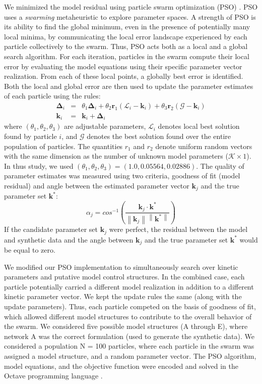 \documentclass[processes,article,accept,moreauthors,pdftex,12pt,a4paper]{mdpi}
\newcommand{\norm}[1]{\left\lVert#1\right\rVert}
\begin{document}
We minimized the model residual using particle swarm optimization (PSO) \citep{PSO}.
PSO uses a \textit{swarming} metaheuristic to explore parameter spaces. 
A strength of PSO is its ability to find the global minimum, even in the presence of potentially many local minima, by communicating the local
error landscape experienced by each particle collectively to the swarm. Thus, PSO acts both as a local and a global search algorithm. 
For each iteration, particles in the swarm compute their local error by evaluating the model equations using their specific parameter vector realization.
From each of these local points, a globally best error is identified. Both the local and global error 
are then used to update the parameter estimates of each particle using the rules:
\begin{eqnarray}
	\mathbf{\Delta}_{i} &=&\theta_{1}\mathbf{\Delta}_{i} + \theta_{2}\mathbf{r}_{1}\left(\mathcal{L}_{i} - \mathbf{k}_{i}\right) + \theta_{3}\mathbf{r}_{2}\left(\mathcal{G} - \mathbf{k}_{i}\right) \\
	\mathbf{k}_{i} &=& \mathbf{k}_{i} + \mathbf{\Delta}_{i}
\end{eqnarray}where $\left(\theta_{1},\theta_{2},\theta_{3}\right)$ are adjustable parameters, $\mathcal{L}_{i}$ denotes local best solution found by particle $i$, and
$\mathcal{G}$ denotes the best solution found over the entire population of particles. The quantities $r_{1}$ and $r_{2}$ denote uniform random vectors with the same dimension as the number of unknown model
parameters ($\mathcal{K}\times{1}$). In thus study, we used $\left(\theta_{1},\theta_{2},\theta_{3}\right) = \left(1.0, 0.05564, 0.02886\right)$. The quality of parameter
estimates was measured using two criteria, goodness of fit (model residual) and angle between the estimated parameter vector $\mathbf{k}_{j}$ and the true parameter set $\mathbf{k}^{*}$:
\begin{equation}
	\alpha_{j} = cos^{-1}\left(\frac{\mathbf{k}_{j}\cdot{\mathbf{k^{*}}}}{\norm{\mathbf{k}_{j}}\norm{\mathbf{k^{*}}}}\right)
\end{equation}If the candidate parameter set $\mathbf{k}_{j}$ were perfect, the residual between the model and synthetic data 
and the angle between $\mathbf{k}_{j}$ and the true parameter set $\mathbf{k}^{*}$ would be equal to zero.

We modified our PSO implementation to simultaneously search over kinetic parameters and putative model control structures.
In the combined case, each particle potentially carried a different model realization in addition to a different kinetic parameter vector. 
We kept the update rules the same (along with the update parameters). 
Thus, each particle competed on the basis of goodness of fit, which allowed different model structures to contribute to the overall behavior of the swarm. 
We considered five possible model structures (A through E), where network A was the correct formulation (used to generate the synthetic data). 
We considered a population N = 100 particles, where each particle in the swarm was assigned a model structure, and a random parameter vector.
The PSO algorithm, model equations, and the objective function were encoded and solved in the Octave programming {language} \citep{Octave:2014}.
\end{document}
